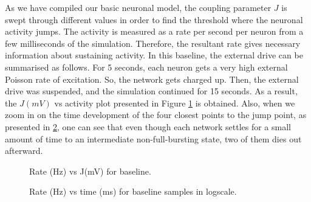 \documentclass[a4paper,12pt]{article}
\begin{document}
As we have compiled our basic neuronal model, the coupling parameter $J$ is swept through different values in order to find the threshold where the neuronal activity jumps. The activity is measured as a rate per second per neuron from a few milliseconds of the simulation. Therefore, the resultant rate gives necessary information about sustaining activity. In this baseline, the external drive can be summarised as follows. For 5 seconds, each neuron gets a very high external Poisson rate of excitation. So, the network gets charged up. Then, the external drive was suspended, and the simulation continued for 15 seconds. As a result, the $J(mV)$ vs activity plot presented in Figure \ref{jvsactivity} is obtained. Also, when we zoom in on the time development of the four closest points to the jump point, as presented in \ref{ratevstime}, one can see that even though each network settles for a small amount of time to an intermediate non-full-bursting state, two of them dies out afterward. 
\begin{figure}[H] 
    \caption{Rate (Hz) vs J(mV) for baseline.}
    \label{jvsactivity}
\end{figure}

\begin{figure}[H] 
    \caption{Rate (Hz) vs time (ms) for baseline samples in logscale.}
    \label{ratevstime}
\end{figure}
\end{document}
